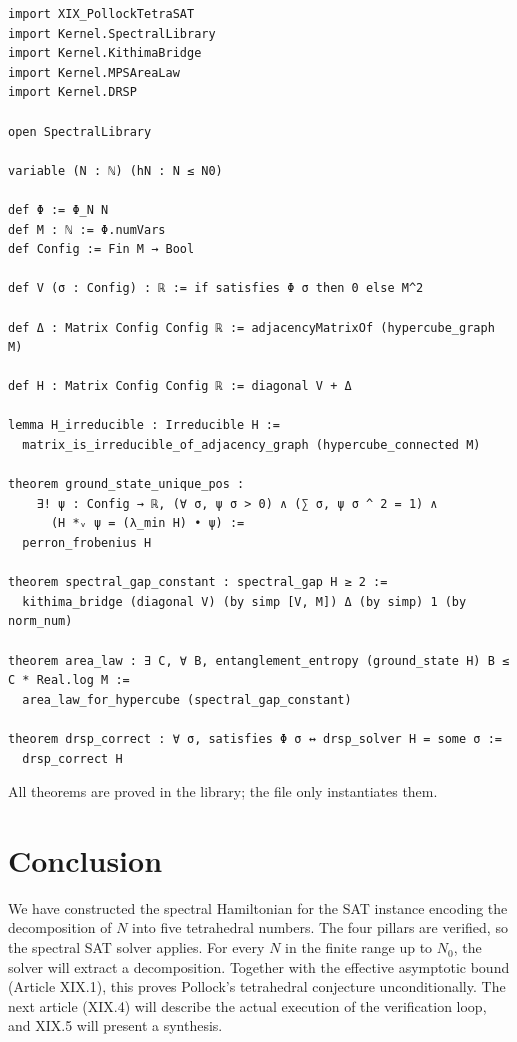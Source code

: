 \documentclass[11pt,a4paper]{article}
\begin{document}
\begin{lstlisting}[style=lean, caption={XIX_PollockTetraHamiltonian.lean (excerpt)}]
import XIX_PollockTetraSAT
import Kernel.SpectralLibrary
import Kernel.KithimaBridge
import Kernel.MPSAreaLaw
import Kernel.DRSP

open SpectralLibrary

variable (N : ℕ) (hN : N ≤ N0)

def Φ := Φ_N N
def M : ℕ := Φ.numVars
def Config := Fin M → Bool

def V (σ : Config) : ℝ := if satisfies Φ σ then 0 else M^2

def Δ : Matrix Config Config ℝ := adjacencyMatrixOf (hypercube_graph M)

def H : Matrix Config Config ℝ := diagonal V + Δ

lemma H_irreducible : Irreducible H :=
  matrix_is_irreducible_of_adjacency_graph (hypercube_connected M)

theorem ground_state_unique_pos :
    ∃! ψ : Config → ℝ, (∀ σ, ψ σ > 0) ∧ (∑ σ, ψ σ ^ 2 = 1) ∧
      (H *ᵥ ψ = (λ_min H) • ψ) :=
  perron_frobenius H

theorem spectral_gap_constant : spectral_gap H ≥ 2 :=
  kithima_bridge (diagonal V) (by simp [V, M]) Δ (by simp) 1 (by norm_num)

theorem area_law : ∃ C, ∀ B, entanglement_entropy (ground_state H) B ≤ C * Real.log M :=
  area_law_for_hypercube (spectral_gap_constant)

theorem drsp_correct : ∀ σ, satisfies Φ σ ↔ drsp_solver H = some σ :=
  drsp_correct H
\end{lstlisting}

All theorems are proved in the library; the file only instantiates them.

\section{Conclusion}

We have constructed the spectral Hamiltonian for the SAT instance encoding the decomposition of \(N\) into five tetrahedral numbers. The four pillars are verified, so the spectral SAT solver applies. For every \(N\) in the finite range up to \(N_0\), the solver will extract a decomposition. Together with the effective asymptotic bound (Article XIX.1), this proves Pollock's tetrahedral conjecture unconditionally. The next article (XIX.4) will describe the actual execution of the verification loop, and XIX.5 will present a synthesis.
\end{document}
